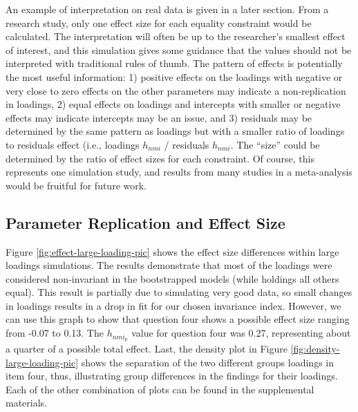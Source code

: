 \documentclass[
  man,floatsintext]{apa7}
\begin{document}
An example of interpretation on real data is given in a later section. From a research study, only one effect size for each equality constraint would be calculated. The interpretation will often be up to the researcher's smallest effect of interest, and this simulation gives some guidance that the values should not be interpreted with traditional rules of thumb. The pattern of effects is potentially the most useful information: 1) positive effects on the loadings with negative or very close to zero effects on the other parameters may indicate a non-replication in loadings, 2) equal effects on loadings and intercepts with smaller or negative effects may indicate intercepts may be an issue, and 3) residuals may be determined by the same pattern as loadings but with a smaller ratio of loadings to residuals effect (i.e., loadings \(h_{nmi}\) / residuals \(h_{nmi}\). The ``size'' could be determined by the ratio of effect sizes for each constraint. Of course, this represents one simulation study, and results from many studies in a meta-analysis would be fruitful for future work.

\subsection{Parameter Replication and Effect Size}\label{parameter-replication-and-effect-size}

Figure \ref{fig:effect-large-loading-pic} shows the effect size differences within large loadings simulations. The results demonstrate that most of the loadings were considered non-invariant in the bootstrapped models (while holdings all others equal). This result is partially due to simulating very good data, so small changes in loadings results in a drop in fit for our chosen invariance index. However, we can use this graph to show that question four shows a possible effect size ranging from -0.07 to 0.13. The \(h_{nmi_p}\) value for question four was 0.27, representing about a quarter of a possible total effect. Last, the density plot in Figure \ref{fig:density-large-loading-pic} shows the separation of the two different groups loadings in item four, thus, illustrating group differences in the findings for their loadings. Each of the other combination of plots can be found in the supplemental materials.
\end{document}
